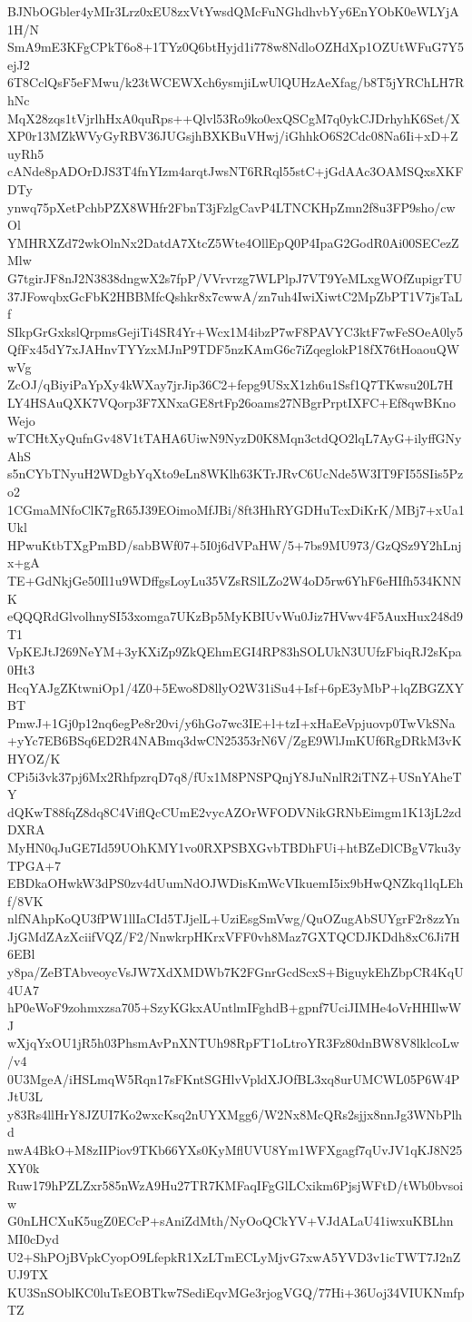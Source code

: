 BJNbOGbler4yMIr3Lrz0xEU8zxVtYwsdQMcFuNGhdhvbYy6EnYObK0eWLYjA1H/N
SmA9mE3KFgCPkT6o8+1TYz0Q6btHyjd1i778w8NdloOZHdXp1OZUtWFuG7Y5ejJ2
6T8CclQsF5eFMwu/k23tWCEWXch6ysmjiLwUlQUHzAeXfag/b8T5jYRChLH7RhNc
MqX28zqs1tVjrlhHxA0quRps++Qlvl53Ro9ko0exQSCgM7q0ykCJDrhyhK6Set/X
XP0r13MZkWVyGyRBV36JUGsjhBXKBuVHwj/iGhhkO6S2Cdc08Na6Ii+xD+ZuyRh5
cANde8pADOrDJS3T4fnYIzm4arqtJwsNT6RRql55stC+jGdAAc3OAMSQxsXKFDTy
ynwq75pXetPchbPZX8WHfr2FbnT3jFzlgCavP4LTNCKHpZmn2f8u3FP9sho/cwOl
YMHRXZd72wkOlnNx2DatdA7XtcZ5Wte4OllEpQ0P4IpaG2GodR0Ai00SECezZMlw
G7tgirJF8nJ2N3838dngwX2s7fpP/VVrvrzg7WLPlpJ7VT9YeMLxgWOfZupigrTU
37JFowqbxGcFbK2HBBMfcQshkr8x7cwwA/zn7uh4IwiXiwtC2MpZbPT1V7jsTaLf
SIkpGrGxkslQrpmsGejiTi4SR4Yr+Wcx1M4ibzP7wF8PAVYC3ktF7wFeSOeA0ly5
QfFx45dY7xJAHnvTYYzxMJnP9TDF5nzKAmG6c7iZqeglokP18fX76tHoaouQWwVg
ZcOJ/qBiyiPaYpXy4kWXay7jrJip36C2+fepg9USxX1zh6u1Ssf1Q7TKwsu20L7H
LY4HSAuQXK7VQorp3F7XNxaGE8rtFp26oams27NBgrPrptIXFC+Ef8qwBKnoWejo
wTCHtXyQufnGv48V1tTAHA6UiwN9NyzD0K8Mqn3ctdQO2lqL7AyG+ilyffGNyAhS
s5nCYbTNyuH2WDgbYqXto9eLn8WKlh63KTrJRvC6UcNde5W3IT9FI55SIis5Pzo2
1CGmaMNfoClK7gR65J39EOimoMfJBi/8ft3HhRYGDHuTcxDiKrK/MBj7+xUa1Ukl
HPwuKtbTXgPmBD/sabBWf07+5I0j6dVPaHW/5+7bs9MU973/GzQSz9Y2hLnjx+gA
TE+GdNkjGe50Il1u9WDffgsLoyLu35VZsRSlLZo2W4oD5rw6YhF6eHIfh534KNNK
eQQQRdGlvolhnySI53xomga7UKzBp5MyKBIUvWu0Jiz7HVwv4F5AuxHux248d9T1
VpKEJtJ269NeYM+3yKXiZp9ZkQEhmEGI4RP83hSOLUkN3UUfzFbiqRJ2sKpa0Ht3
HcqYAJgZKtwniOp1/4Z0+5Ewo8D8llyO2W31iSu4+Isf+6pE3yMbP+lqZBGZXYBT
PmwJ+1Gj0p12nq6egPe8r20vi/y6hGo7wc3IE+l+tzI+xHaEeVpjuovp0TwVkSNa
+yYc7EB6BSq6ED2R4NABmq3dwCN25353rN6V/ZgE9WlJmKUf6RgDRkM3vKHYOZ/K
CPi5i3vk37pj6Mx2RhfpzrqD7q8/fUx1M8PNSPQnjY8JuNnlR2iTNZ+USnYAheTY
dQKwT88fqZ8dq8C4ViflQcCUmE2vycAZOrWFODVNikGRNbEimgm1K13jL2zdDXRA
MyHN0qJuGE7Id59UOhKMY1vo0RXPSBXGvbTBDhFUi+htBZeDlCBgV7ku3yTPGA+7
EBDkaOHwkW3dPS0zv4dUumNdOJWDisKmWcVIkuemI5ix9bHwQNZkq1lqLEhf/8VK
nlfNAhpKoQU3fPW1llIaCId5TJjelL+UziEsgSmVwg/QuOZugAbSUYgrF2r8zzYn
JjGMdZAzXciifVQZ/F2/NnwkrpHKrxVFF0vh8Maz7GXTQCDJKDdh8xC6Ji7H6EBl
y8pa/ZeBTAbveoycVsJW7XdXMDWb7K2FGnrGcdScxS+BiguykEhZbpCR4KqU4UA7
hP0eWoF9zohmxzsa705+SzyKGkxAUntlmIFghdB+gpnf7UciJIMHe4oVrHHIlwWJ
wXjqYxOU1jR5h03PhsmAvPnXNTUh98RpFT1oLtroYR3Fz80dnBW8V8lklcoLw/v4
0U3MgeA/iHSLmqW5Rqn17sFKntSGHlvVpldXJOfBL3xq8urUMCWL05P6W4PJtU3L
y83Rs4llHrY8JZUI7Ko2wxcKsq2nUYXMgg6/W2Nx8McQRs2sjjx8nnJg3WNbPlhd
nwA4BkO+M8zIIPiov9TKb66YXs0KyMflUVU8Ym1WFXgagf7qUvJV1qKJ8N25XY0k
Ruw179hPZLZxr585nWzA9Hu27TR7KMFaqIFgGlLCxikm6PjsjWFtD/tWb0bvsoiw
G0nLHCXuK5ugZ0ECcP+sAniZdMth/NyOoQCkYV+VJdALaU41iwxuKBLhnMI0cDyd
U2+ShPOjBVpkCyopO9LfepkR1XzLTmECLyMjvG7xwA5YVD3v1icTWT7J2nZUJ9TX
KU3SnSOblKC0luTsEOBTkw7SediEqvMGe3rjogVGQ/77Hi+36Uoj34VIUKNmfpTZ
